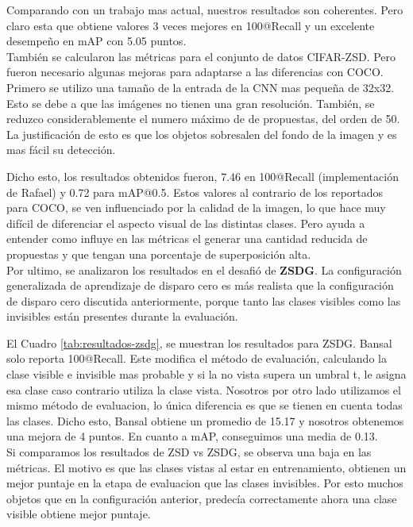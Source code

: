 Comparando con un trabajo mas actual, nuestros resultados son coherentes. Pero claro esta que obtiene valores 3 veces mejores en  100@Recall y un excelente desempeño en mAP con 5.05 puntos.\\

También se calcularon las métricas para el conjunto de datos CIFAR-ZSD. Pero fueron necesario algunas mejoras para adaptarse a las diferencias con COCO. Primero se utilizo una tamaño de la entrada de la CNN mas pequeña de 32x32. Esto se debe a que las imágenes no tienen una gran resolución. También, se reduzco considerablemente el numero máximo de de propuestas, del orden de 50. La justificación de esto es que los objetos sobresalen del fondo de la imagen y es mas fácil su detección.

Dicho esto, los resultados obtenidos fueron, 7.46 en 100@Recall (implementación de Rafael) y 0.72 para mAP@0.5. Estos valores al contrario de los reportados para COCO, se ven influenciado por la calidad de la imagen, lo que hace muy difícil de diferenciar el aspecto visual de las distintas clases. Pero ayuda a entender como influye en las métricas el generar una cantidad reducida de propuestas y que tengan una porcentaje de superposición alta.\\

Por ultimo, se analizaron los resultados en el desafió de \textbf{ZSDG}. La configuración generalizada de aprendizaje de disparo cero es más realista que la configuración de disparo cero discutida anteriormente, porque tanto las clases visibles como las invisibles están presentes durante la evaluación.

El Cuadro \ref{tab:resultados-zsdg}, se muestran los resultados para ZSDG. Bansal solo reporta 100@Recall. Este modifica el método de evaluación, calculando la clase visible e invisible mas probable y si la no vista supera un umbral t, le asigna esa clase caso contrario utiliza la clase vista. Nosotros por otro lado utilizamos el mismo método de evaluacion, lo única diferencia es que se tienen en cuenta todas las clases. Dicho esto, Bansal obtiene un promedio de 15.17 y nosotros obtenemos una mejora de 4 puntos. En cuanto a mAP, conseguimos una media de 0.13.\\

Si comparamos los resultados de ZSD vs ZSDG, se observa una baja en las métricas. El motivo es que las clases vistas al estar en entrenamiento, obtienen un mejor puntaje en la etapa de evaluacion que las clases invisibles. Por esto muchos objetos que en la configuración anterior, predecía correctamente ahora una clase visible obtiene mejor puntaje.\\

